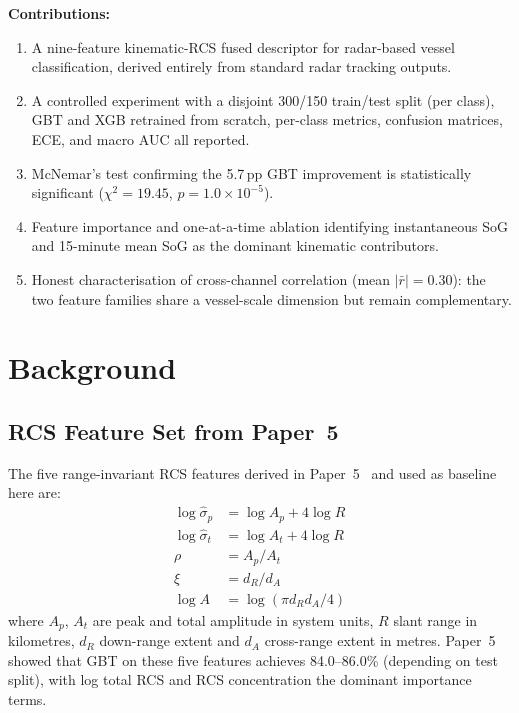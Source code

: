 \documentclass[journal]{IEEEtran}
\begin{document}
\medskip\noindent\textbf{Contributions:}
\begin{enumerate}
\item A nine-feature kinematic-RCS fused descriptor for radar-based
      vessel classification, derived entirely from standard radar
      tracking outputs.
\item A controlled experiment with a disjoint 300/150 train/test split
      (per class), GBT and XGB retrained from scratch, per-class
      metrics, confusion matrices, ECE, and macro AUC all reported.
\item McNemar's test confirming the 5.7\,pp GBT improvement is
      statistically significant ($\chi^2 = 19.45$,
      $p = 1.0 \times 10^{-5}$).
\item Feature importance and one-at-a-time ablation identifying
      instantaneous SoG and 15-minute mean SoG as the dominant
      kinematic contributors.
\item Honest characterisation of cross-channel correlation
      (mean $|\bar{r}| = 0.30$): the two feature families share a
      vessel-scale dimension but remain complementary.
\end{enumerate}

\section{Background}
\label{sec:background}

\subsection{RCS Feature Set from Paper~5}

The five range-invariant RCS features derived in Paper~5~\cite{paper5rcs}
and used as baseline here are:
\begin{align}
  \log\hat{\sigma}_p &= \log A_p + 4\log R \label{eq:rcs_p}\\
  \log\hat{\sigma}_t &= \log A_t + 4\log R \label{eq:rcs_t}\\
  \rho               &= A_p / A_t          \label{eq:conc}\\
  \xi                &= d_R / d_A          \label{eq:ar}\\
  \log A             &= \log(\pi d_R d_A/4)\label{eq:fp}
\end{align}
where $A_p$, $A_t$ are peak and total amplitude in system units, $R$
slant range in kilometres, $d_R$ down-range extent and $d_A$
cross-range extent in metres. Paper~5 showed that GBT on these five
features achieves 84.0--86.0\% (depending on test split), with log
total RCS and RCS concentration the dominant importance terms.
\end{document}
